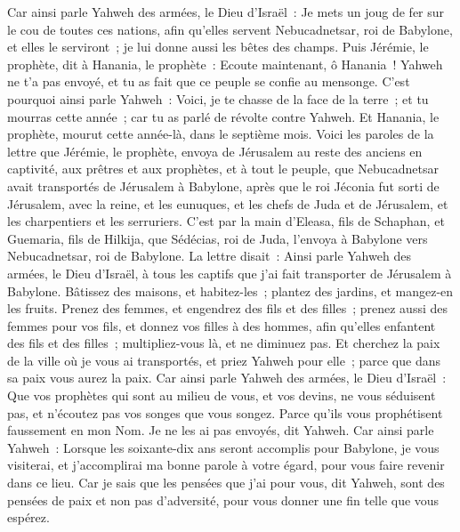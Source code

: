 \begin{multicols}{2}
Car ainsi parle Yahweh des armées, le Dieu d'Israël~: Je mets un joug de fer sur le cou de toutes ces nations, afin qu'elles servent Nebucadnetsar, roi de Babylone, et elles le serviront~; je lui donne aussi les bêtes des champs.
Puis Jérémie, le prophète, dit à Hanania, le prophète~: Ecoute maintenant, ô Hanania~! Yahweh ne t'a pas envoyé, et tu as fait que ce peuple se confie au mensonge.
C'est pourquoi ainsi parle Yahweh~: Voici, je te chasse de la face de la terre~; et tu mourras cette année~; car tu as parlé de révolte contre Yahweh.
Et Hanania, le prophète, mourut cette année-là, dans le septième mois.
\VerseOne{}Voici les paroles de la lettre que Jérémie, le prophète, envoya de Jérusalem au reste des anciens en captivité, aux prêtres et aux prophètes, et à tout le peuple, que Nebucadnetsar avait transportés de Jérusalem à Babylone,
après que le roi Jéconia fut sorti de Jérusalem, avec la reine, et les eunuques, et les chefs de Juda et de Jérusalem, et les charpentiers et les serruriers.
C'est par la main d'Eleasa, fils de Schaphan, et Guemaria, fils de Hilkija, que Sédécias, roi de Juda, l'envoya à Babylone vers Nebucadnetsar, roi de Babylone. La lettre disait~:
Ainsi parle Yahweh des armées, le Dieu d'Israël, à tous les captifs que j'ai fait transporter de Jérusalem à Babylone.
Bâtissez des maisons, et habitez-les~; plantez des jardins, et mangez-en les fruits.
Prenez des femmes, et engendrez des fils et des filles~; prenez aussi des femmes pour vos fils, et donnez vos filles à des hommes, afin qu'elles enfantent des fils et des filles~; multipliez-vous là, et ne diminuez pas.
Et cherchez la paix de la ville où je vous ai transportés, et priez Yahweh pour elle~; parce que dans sa paix vous aurez la paix.
Car ainsi parle Yahweh des armées, le Dieu d'Israël~: Que vos prophètes qui sont au milieu de vous, et vos devins, ne vous séduisent pas, et n'écoutez pas vos songes que vous songez.
Parce qu'ils vous prophétisent faussement en mon Nom. Je ne les ai pas envoyés, dit Yahweh.
Car ainsi parle Yahweh~: Lorsque les soixante-dix ans seront accomplis pour Babylone, je vous visiterai, et j'accomplirai ma bonne parole à votre égard, pour vous faire revenir dans ce lieu.
Car je sais que les pensées que j'ai pour vous, dit Yahweh, sont des pensées de paix et non pas d'adversité, pour vous donner une fin telle que vous espérez.

\end{multicols}
